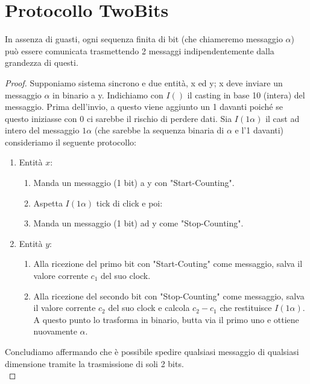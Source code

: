 \section{Protocollo TwoBits}

\begin{theorem}
    In assenza di guasti, ogni sequenza finita di bit (che chiameremo
    messaggio $\alpha$) può essere comunicata trasmettendo 2 messaggi
    indipendentemente dalla grandezza di questi.
\end{theorem}

\begin{proof}
    Supponiamo
    sistema sincrono e due entità, x ed y; x deve inviare un messaggio $\alpha$ in
    binario a y. Indichiamo con $I()$ il casting in base 10 (intera) del
    messaggio. Prima dell'invio, a questo viene aggiunto un 1 davanti poiché se
    questo iniziasse con 0 ci sarebbe il rischio di perdere dati. Sia $I(1\alpha)$
    il cast ad intero del messaggio $1\alpha$ (che sarebbe la sequenza binaria di
    $\alpha$ e l'1 davanti) consideriamo il seguente protocollo:
    \begin{enumerate}
        \item Entità $x$:
              \begin{enumerate}
                  \item Manda un messaggio (1 bit) a y con "Start-Counting".
                  \item Aspetta $I(1\alpha)$ tick di click e poi:
                  \item Manda un messaggio (1 bit) ad y come "Stop-Counting".
              \end{enumerate}
        \item Entità $y$:
              \begin{enumerate}
                  \item Alla ricezione del primo bit con "Start-Couting" come messaggio,
                        salva il valore corrente $c_1$ del suo clock.
                  \item Alla ricezione del secondo bit con "Stop-Counting" come
                        messaggio, salva il valore corrente $c_2$ del suo clock e calcola $c_2
                            - c_1$ che restituisce $I(1\alpha)$. A questo punto lo trasforma in
                        binario, butta via il primo uno e ottiene nuovamente $\alpha$.
              \end{enumerate}
    \end{enumerate}
    Concludiamo affermando che è possibile spedire qualsiasi messaggio di qualsiasi
    dimensione tramite la trasmissione di soli 2 bits.\\
\end{proof}

